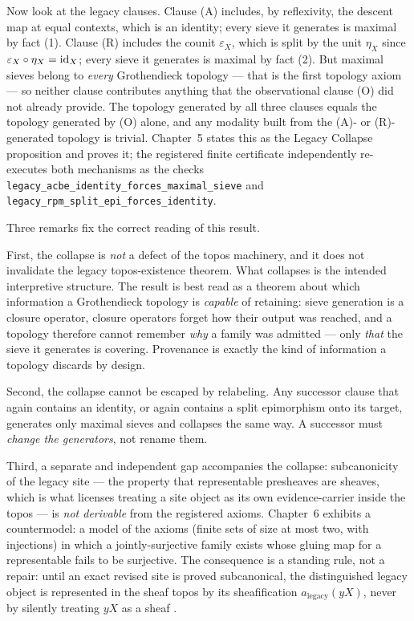 Now look at the legacy clauses. Clause (A) includes, by reflexivity, the
descent map at equal contexts, which is an identity; every sieve it
generates is maximal by fact (1). Clause (R) includes the counit
$\varepsilon_X$, which is split by the unit $\eta_X$ since
$\varepsilon_X \circ \eta_X = \mathrm{id}_X$; every sieve it generates is maximal by
fact (2). But maximal sieves belong to \emph{every} Grothendieck topology
--- that is the first topology axiom --- so neither clause contributes
anything that the observational clause (O) did not already provide. The
topology generated by all three clauses equals the topology generated by (O)
alone, and any modality built from the (A)- or (R)-generated topology is
trivial. Chapter~5 states this as the Legacy Collapse proposition and proves
it; the registered finite certificate independently re-executes both
mechanisms as the checks
\texttt{legacy\_acbe\_identity\_forces\_maximal\_sieve} and
\texttt{legacy\_rpm\_split\_epi\_forces\_identity}.

Three remarks fix the correct reading of this result.

First, the collapse is \emph{not} a defect of the topos machinery, and it
does not invalidate the legacy topos-existence theorem. What collapses is
the intended interpretive structure. The result is best read as a theorem
about which information a Grothendieck topology is \emph{capable} of
retaining: sieve generation is a closure operator, closure operators forget
how their output was reached, and a topology therefore cannot remember
\emph{why} a family was admitted --- only \emph{that} the sieve it generates
is covering. Provenance is exactly the kind of information a topology
discards by design.

Second, the collapse cannot be escaped by relabeling. Any successor clause
that again contains an identity, or again contains a split epimorphism onto
its target, generates only maximal sieves and collapses the same way. A
successor must \emph{change the generators}, not rename them.

Third, a separate and independent gap accompanies the collapse:
subcanonicity of the legacy site --- the property that representable
presheaves are sheaves, which is what licenses treating a site object as its
own evidence-carrier inside the topos --- is \emph{not derivable} from the
registered axioms. Chapter~6 exhibits a countermodel: a model of the axioms
(finite sets of size at most two, with injections) in which a
jointly-surjective family exists whose gluing map for a representable fails
to be surjective. The consequence is a standing rule, not a repair: until an
exact revised site is proved subcanonical, the distinguished legacy object
is represented in the sheaf topos by its sheafification
$a_{\mathrm{legacy}}(yX)$, never by silently treating $yX$ as a sheaf
\cite{stacks00WO}.

